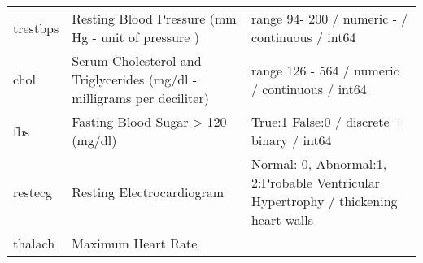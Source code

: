 \documentclass[11pt]{article}
\begin{document}
\begin{longtable}[]{@{}lll@{}}
\begin{minipage}[t]{0.09\columnwidth}
trestbps\strut
\end{minipage} & \begin{minipage}[t]{0.44\columnwidth}\raggedright\strut
Resting Blood Pressure (mm Hg - unit of pressure )\strut
\end{minipage} & \begin{minipage}[t]{0.38\columnwidth}\raggedright\strut
range 94- 200 / numeric - / continuous / int64\strut
\end{minipage}\tabularnewline
\begin{minipage}[t]{0.09\columnwidth}\raggedright\strut
chol\strut
\end{minipage} & \begin{minipage}[t]{0.44\columnwidth}\raggedright\strut
Serum Cholesterol and Triglycerides (mg/dl - milligrams per
deciliter)\strut
\end{minipage} & \begin{minipage}[t]{0.38\columnwidth}\raggedright\strut
range 126 - 564 / numeric / continuous / int64\strut
\end{minipage}\tabularnewline
\begin{minipage}[t]{0.09\columnwidth}\raggedright\strut
fbs\strut
\end{minipage} & \begin{minipage}[t]{0.44\columnwidth}\raggedright\strut
Fasting Blood Sugar \textgreater{} 120 (mg/dl)\strut
\end{minipage} & \begin{minipage}[t]{0.38\columnwidth}\raggedright\strut
True:1 False:0 / discrete + binary / int64\strut
\end{minipage}\tabularnewline
\begin{minipage}[t]{0.09\columnwidth}\raggedright\strut
restecg\strut
\end{minipage} & \begin{minipage}[t]{0.44\columnwidth}\raggedright\strut
Resting Electrocardiogram\strut
\end{minipage} & \begin{minipage}[t]{0.38\columnwidth}\raggedright\strut
Normal: 0, Abnormal:1, 2:Probable Ventricular Hypertrophy / thickening
heart walls\strut
\end{minipage}\tabularnewline
\begin{minipage}[t]{0.09\columnwidth}\raggedright\strut
thalach\strut
\end{minipage} & \begin{minipage}[t]{0.44\columnwidth}\raggedright\strut
Maximum Heart Rate\strut
\end{minipage} & \begin{minipage}[t]{0.38\columnwidth}\raggedright\strut

\end{minipage}
\end{longtable}
\end{document}
